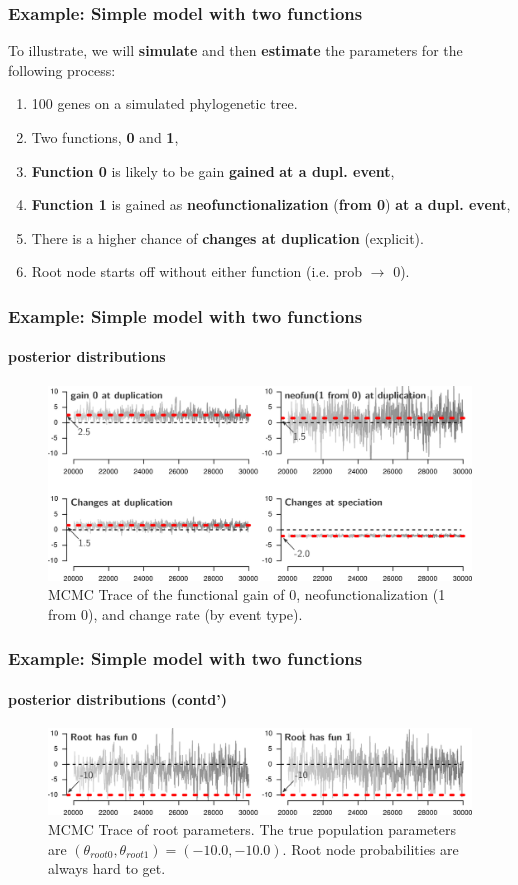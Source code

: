 \documentclass[aspectratio=169,9pt,handout]{beamer}
\begin{document}
\begin{frame}[c,label=example-geese1]
	\frametitle{Example: Simple model with two functions}
	To illustrate, we will \textbf{simulate} and then \textbf{estimate} the parameters for the following process:
	\begin{enumerate}
		\item<2-> 100 genes on a simulated phylogenetic tree.
		\item<2-> Two functions, \textbf{0} and \textbf{1},
		\item<3-> {\color{blue}\textbf{Function 0}} is likely to be gain \textbf{gained} \textbf{at a dupl. event},
		\item<3-> {\color{red}\textbf{Function 1}} is gained as \textbf{neofunctionalization} ({\color{blue}\textbf{from 0}}) \textbf{at a dupl. event},
		\item<4-> There is a higher chance of \textbf{changes at duplication} (explicit).
		\item<4-> Root node starts off without either function (i.e. prob $\to$ 0).
	\end{enumerate}
	\vfill
	\hfill\uncover<5->{\hyperlink{geese-vs-aphylo}{\beamerreturnbutton{go back}}}
	
\end{frame}


\begin{frame}[c]
	\frametitle{Example: Simple model with two functions}
	\framesubtitle{posterior distributions}
	\begin{figure}
		\includegraphics[width=.8\linewidth]{fig/trace-gain-neo.png}
		\caption{MCMC Trace of the functional gain of 0, neofunctionalization (1 from 0), and change rate (by event type).}
	\end{figure}
\end{frame}


\begin{frame}[c]
	\frametitle{Example: Simple model with two functions}
	\framesubtitle{posterior distributions (contd')}
	\begin{figure}
		\includegraphics[width=.8\linewidth]{fig/trace-root.png}
		\caption{MCMC Trace of root parameters. The true population parameters are $(\theta_{root0}, \theta_{root1}) = (-10.0, -10.0)$. Root node probabilities are always hard to get.}
	\end{figure}
\end{frame}
\end{document}
